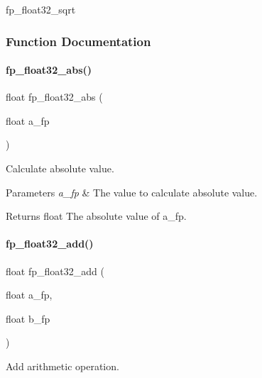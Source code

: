 fp\+\_\+float32\+\_\+sqrt 

\subsubsection{Function Documentation}
\mbox{\label{a00023_a50dbb1be8035ed17c71df34d180056e0}} 
\paragraph{\texorpdfstring{fp\+\_\+float32\+\_\+abs()}{fp\_float32\_abs()}}
{\footnotesize\ttfamily float fp\+\_\+float32\+\_\+abs (\begin{DoxyParamCaption}\item[{float}]{a\+\_\+fp }\end{DoxyParamCaption})}



Calculate absolute value. 


\begin{DoxyParams}{Parameters}
{\em a\+\_\+fp} & The value to calculate absolute value. \\
\hline
\end{DoxyParams}
\begin{DoxyReturn}{Returns}
float The absolute value of a\+\_\+fp. 
\end{DoxyReturn}
\mbox{\label{a00023_a05d59640c2e2b66e3f13e423c0779ce9}} 
\paragraph{\texorpdfstring{fp\+\_\+float32\+\_\+add()}{fp\_float32\_add()}}
{\footnotesize\ttfamily float fp\+\_\+float32\+\_\+add (\begin{DoxyParamCaption}\item[{float}]{a\+\_\+fp,  }\item[{float}]{b\+\_\+fp }\end{DoxyParamCaption})}



Add arithmetic operation. 


